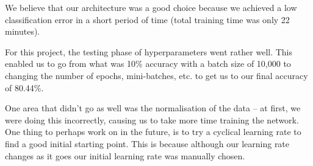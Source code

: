 \documentclass[journal,twoside]{IEEEtran}
\begin{document}
We believe that our architecture was a good choice because we achieved a low classification error in a short period of time (total training time was only 22 minutes).

For this project, the testing phase of hyperparameters went rather well. This enabled us to go from what was 10\% accuracy with a batch size of 10,000 to changing the number of epochs, mini-batches, etc. to get us to our final accuracy of 80.44\%.

One area that didn't go as well was the normalisation of the data -- at first, we were doing this incorrectly, causing us to take more time training the network. One thing to perhaps work on in the future, is to try a cyclical learning rate to find a good initial starting point. This is because although our learning rate changes as it goes our initial learning rate was manually chosen.

\printbibliography[heading=bibintoc]
\end{document}
